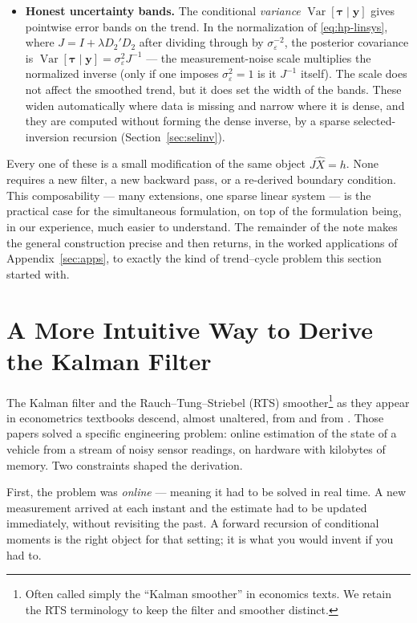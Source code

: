 \documentclass[11pt]{article}
\newcommand{\Var}{\operatorname{Var}}
\begin{document}
\begin{itemize}[leftmargin=2em,itemsep=4pt]
\item \textbf{Honest uncertainty bands.}  The conditional \emph{variance}
$\Var[\bm\tau\mid\bm y]$ gives pointwise error bands on the trend.  In
the normalization of \eqref{eq:hp-linsys}, where $J=I+\lambda D_2'D_2$
after dividing through by $\sigma_\varepsilon^{-2}$, the posterior
covariance is $\Var[\bm\tau\mid\bm y]=\sigma_\varepsilon^2 J^{-1}$ ---
the measurement-noise scale multiplies the normalized inverse (only if
one imposes $\sigma_\varepsilon^2=1$ is it $J^{-1}$ itself).  The
scale does not affect the smoothed trend, but it does set the width of
the bands.  These widen automatically where data is
missing and narrow where it is dense, and they are computed without
forming the dense inverse, by a sparse selected-inversion recursion
(Section~\ref{sec:selinv}).

\end{itemize}

Every one of these is a small modification of the same object
$J\widehat X=h$.  None requires a new filter, a new backward pass, or a
re-derived boundary condition.  This composability --- many extensions,
one sparse linear system --- is the practical case for the simultaneous
formulation, on top of the formulation being, in our experience, much
easier to understand.  The remainder of the note makes the general
construction precise and then returns, in the worked applications of
Appendix~\ref{sec:apps}, to exactly the kind of trend--cycle problem
this section started with.

\section{A More Intuitive Way to Derive the Kalman Filter}

The Kalman filter and the Rauch--Tung--Striebel (RTS) smoother\footnote{Often
called simply the ``Kalman smoother'' in economics texts.  We retain the
RTS terminology to keep the filter and smoother distinct.} as they appear
in econometrics textbooks descend, almost unaltered, from \citet{Kalman1960}
and from \citet{RTS1965}.  Those papers solved a specific engineering
problem: online estimation of the state of a vehicle from a stream of
noisy sensor readings, on hardware with kilobytes of memory.  Two
constraints shaped the derivation.

First, the problem was \emph{online} --- meaning it had to be solved in
real time.  A new measurement arrived at each instant and the estimate
had to be updated immediately, without revisiting the past.  A forward
recursion of conditional moments is the right object for that setting;
it is what you would invent if you had to.
\end{document}
